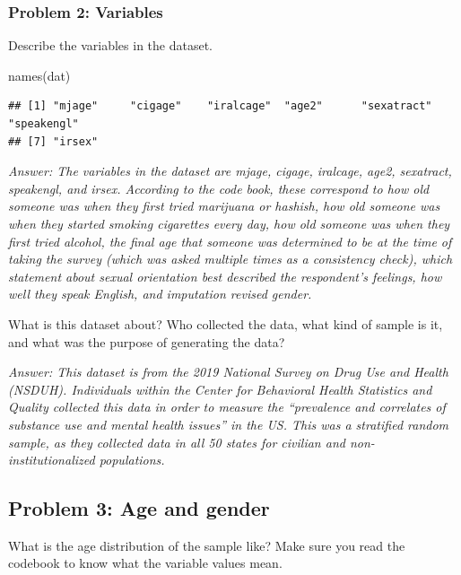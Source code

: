 \documentclass[
]{article}
\newenvironment{Shaded}{\begin{snugshade}}{\end{snugshade}}
\newcommand{\FunctionTok}[1]{\textcolor[rgb]{0.00,0.00,0.00}{#1}}
\newcommand{\NormalTok}[1]{#1}
\begin{document}
\hypertarget{problem-2-variables}{%
\subsubsection{Problem 2: Variables}\label{problem-2-variables}}

Describe the variables in the dataset.

\begin{Shaded}
\begin{Highlighting}[]
\FunctionTok{names}\NormalTok{(dat)}
\end{Highlighting}
\end{Shaded}

\begin{verbatim}
## [1] "mjage"     "cigage"    "iralcage"  "age2"      "sexatract" "speakengl"
## [7] "irsex"
\end{verbatim}

\emph{Answer: The variables in the dataset are mjage, cigage, iralcage,
age2, sexatract, speakengl, and irsex. According to the code book, these
correspond to how old someone was when they first tried marijuana or
hashish, how old someone was when they started smoking cigarettes every
day, how old someone was when they first tried alcohol, the final age
that someone was determined to be at the time of taking the survey
(which was asked multiple times as a consistency check), which statement
about sexual orientation best described the respondent's feelings, how
well they speak English, and imputation revised gender.}

What is this dataset about? Who collected the data, what kind of sample
is it, and what was the purpose of generating the data?

\emph{Answer: This dataset is from the 2019 National Survey on Drug Use
and Health (NSDUH). Individuals within the Center for Behavioral Health
Statistics and Quality collected this data in order to measure the
``prevalence and correlates of substance use and mental health issues''
in the US. This was a stratified random sample, as they collected data
in all 50 states for civilian and non-institutionalized populations.}

\hypertarget{problem-3-age-and-gender}{%
\subsection{Problem 3: Age and gender}\label{problem-3-age-and-gender}}

What is the age distribution of the sample like? Make sure you read the
codebook to know what the variable values mean.
\end{document}
